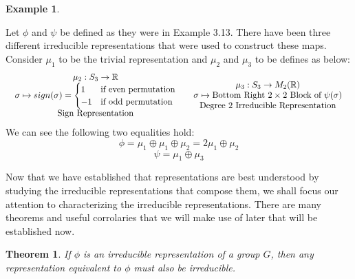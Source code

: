 \documentclass[10pt]{ucthesis}
\newtheorem{theorem}[definition]{Theorem}
\newtheorem{example}[definition]{Example}
\begin{document}
\begin{example}\end{example}
	Let $\phi$ and $\psi$ be defined as they were in Example 3.13. There have been three different irreducible representations that were used to construct these maps. Consider $\mu_1$ to be the trivial representation and $\mu_2$ and $\mu_3$ to be defines as below:
$$\begin{array}{c c}
	\begin{array}{c}
		\mu_2 : S_3 \rightarrow \mathbb{R} \\
		\sigma \mapsto sign(\sigma) = \begin{cases}
										1 & \text{if even permutation} \\
										-1 & \text{if odd permutation}
									   \end{cases}\\
		\text{Sign Representation}
	\end{array}
&
	\begin{array}{c}
		\mu_3 : S_3 \rightarrow M_2(\mathbb{R}) \\
		\sigma \mapsto \text{Bottom Right } 2\times2 \text{ Block of } \psi(\sigma)\\
		\text{Degree 2 Irreducible Representation}
	\end{array}
\end{array}$$
We can see the following two equalities hold:
$$\phi = \mu_1 \oplus \mu_1 \oplus \mu_2 = 2\mu_1 \oplus \mu_2$$
$$\psi = \mu_1 \oplus \mu_3$$

Now that we have established that representations are best understood by studying the irreducible representations that compose them, we shall focus our attention to characterizing the irreducible representations. There are many theorems and useful corrolaries that we will make use of later that will be established now.

\begin{theorem}
	If $\phi$ is an irreducible representation of a group $G$, then any representation equivalent to $\phi$ must also be irreducible.
\end{theorem}
\end{document}

